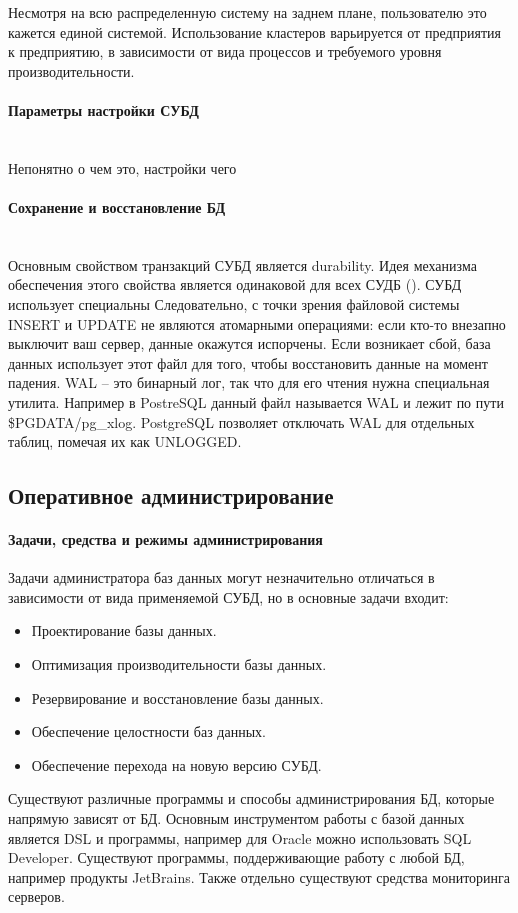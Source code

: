 Несмотря на всю распределенную систему на заднем плане, пользователю это кажется единой системой. Использование кластеров варьируется от предприятия к предприятию, в зависимости от вида процессов и требуемого уровня производительности.
\paragraph{Параметры настройки СУБД}~\\
Непонятно о чем это, настройки чего~\\

\paragraph{Сохранение и восстановление БД}~\\

Основным свойством транзакций СУБД является durability. Идея механизма обеспечения этого свойства является одинаковой для всех СУДБ (\autocite{PostrgreSQL1}). СУБД использует специальны
Следовательно, с точки зрения файловой системы INSERT и UPDATE не являются атомарными операциями: если кто-то внезапно выключит ваш сервер, данные окажутся испорчены. Если возникает сбой, база данных использует этот файл для того, чтобы восстановить данные на момент падения. WAL -- это бинарный лог, так что для его чтения нужна специальная утилита.
Например в PostreSQL данный файл называется WAL и лежит по пути \$PGDATA/pg\_xlog.
PostgreSQL позволяет отключать WAL для отдельных таблиц, помечая их как UNLOGGED.

\subsection{Оперативное администрирование}
\paragraph{Задачи, средства и режимы администрирования}

Задачи администратора баз данных могут незначительно отличаться в зависимости от вида применяемой СУБД, но в основные задачи входит:
\begin{itemize}
    \item Проектирование базы данных.
    \item Оптимизация производительности базы данных.
    \item Резервирование и восстановление базы данных.
    \item Обеспечение целостности баз данных.
    \item Обеспечение перехода на новую версию СУБД.
\end{itemize}
Существуют различные программы и способы администрирования БД, которые напрямую зависят от БД. Основным инструментом работы с базой данных является DSL и программы, например для Oracle можно использовать SQL Developer. Существуют программы, поддерживающие работу с любой БД, например продукты JetBrains.  Также отдельно существуют средства мониторинга серверов.
